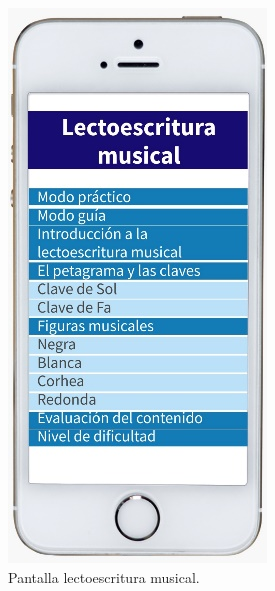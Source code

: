 \documentclass[spanish]{textolivre}
\begin{document}
\hfill
\begin{minipage}[b]{0.30\textwidth}
    \begin{figure}[H]
        \centering
        \includegraphics[width=\linewidth]{Fig2.png}
        \caption{Pantalla lectoescritura musical.}
    \end{figure}
\end{minipage}
\end{document}
